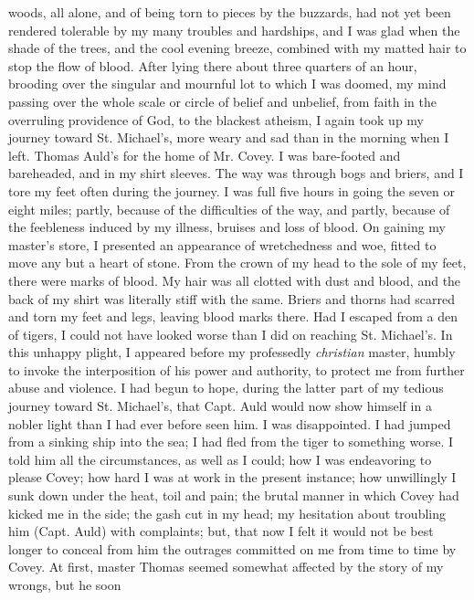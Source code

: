 woods, all alone, and of being torn to pieces by the buzzards, had not
yet been rendered tolerable by my many troubles and hardships,
{\protect\hypertarget{228}{}{}}and I was glad when the shade of the
trees, and the cool evening breeze, combined with my matted hair to stop
the flow of blood. After lying there about three quarters of an hour,
brooding over the singular and mournful lot to which I was doomed, my
mind passing over the whole scale or circle of belief and unbelief, from
faith in the overruling providence of God, to the blackest atheism, I
again took up my journey toward St. Michael's, more weary and sad than
in the morning when I left. Thomas Auld's for the home of Mr. Covey. I
was bare-footed and bareheaded, and in my shirt sleeves. The way was
through bogs and briers, and I tore my feet often during the journey. I
was full five hours in going the seven or eight miles; partly, because
of the difficulties of the way, and partly, because of the feebleness
induced by my illness, bruises and loss of blood. On gaining my master's
store, I presented an appearance of wretchedness and woe, fitted to move
any but a heart of stone. From the crown of my head to the sole of my
feet, there were marks of blood. My hair was all clotted with dust and
blood, and the back of my shirt was literally stiff with the same.
Briers and thorns had scarred and torn my feet and legs, leaving blood
marks there. Had I escaped from a den of tigers, I could not have looked
worse than I did on reaching St. Michael's. In this unhappy plight, I
appeared before my professedly \emph{christian} master, humbly to invoke
the interposition of his power and authority, to protect me from further
abuse and violence. I had begun to hope, during the latter part of my
tedious journey toward St. Michael's, that Capt. Auld would
{\protect\hypertarget{229}{}{}} now show himself in a nobler light than
I had ever before seen him. I was disappointed. I had jumped from a
sinking ship into the sea; I had fled from the tiger to something worse.
I told him all the circumstances, as well as I could; how I was
endeavoring to please Covey; how hard I was at work in the present
instance; how unwillingly I sunk down under the heat, toil and pain; the
brutal manner in which Covey had kicked me in the side; the gash cut in
my head; my hesitation about troubling him (Capt. Auld) with complaints;
but, that now I felt it would not be best longer to conceal from him the
outrages committed on me from time to time by Covey. At first, master
Thomas seemed somewhat affected by the story of my wrongs, but he soon
